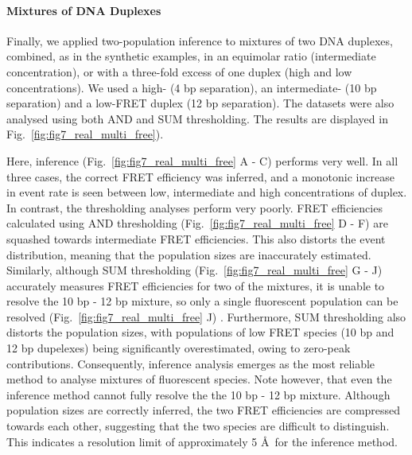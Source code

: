 \paragraph*{Mixtures of DNA Duplexes}
Finally, we applied two-population inference to mixtures of two DNA duplexes, combined, as in the synthetic examples, in an equimolar ratio (intermediate concentration), or with a three-fold excess of one duplex (high and low concentrations). We used a high- (4 bp separation), an intermediate- (10 bp separation) and a low-FRET duplex (12 bp separation). The datasets were also analysed using both AND and SUM thresholding. The results are displayed in Fig.~\ref{fig:fig7_real_multi_free}). 

Here, inference (Fig.~\ref{fig:fig7_real_multi_free} A - C) performs very well. In all three cases, the correct FRET efficiency was inferred, and a monotonic increase in event rate is seen between low, intermediate and high concentrations of duplex. In contrast, the thresholding analyses perform very poorly. FRET efficiencies calculated using AND thresholding (Fig.~\ref{fig:fig7_real_multi_free} D - F) are squashed towards intermediate FRET efficiencies. This also distorts the event distribution, meaning that the population sizes are inaccurately estimated. Similarly, although SUM thresholding (Fig.~\ref{fig:fig7_real_multi_free} G - J) accurately measures FRET efficiencies for two of the mixtures, it is unable to resolve the 10 bp - 12 bp mixture, so only a single fluorescent population can be resolved (Fig.~\ref{fig:fig7_real_multi_free} J) . Furthermore, SUM thresholding also distorts the population sizes, with populations of low FRET species (10 bp and 12 bp dupelexes) being significantly overestimated, owing to zero-peak contributions. Consequently, inference analysis emerges as the most reliable method to analyse mixtures of fluorescent species. Note however, that even the inference method cannot fully resolve the the 10 bp - 12 bp mixture. Although population sizes are correctly inferred, the two FRET efficiencies are compressed towards each other, suggesting that the two species are difficult to distinguish. This indicates a resolution limit of approximately 5 \AA~for the inference method.    

